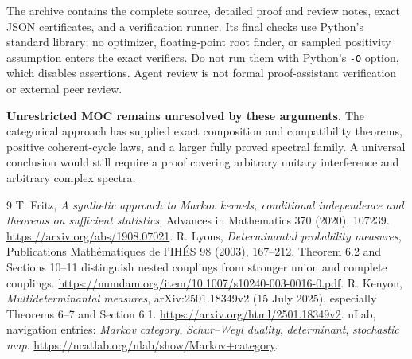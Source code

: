 \documentclass[11pt]{article}
\begin{document}
The archive contains the complete source, detailed proof and review notes, exact JSON certificates, and a verification runner. Its final checks use Python's standard library; no optimizer, floating-point root finder, or sampled positivity assumption enters the exact verifiers. Do not run them with Python's \texttt{-O} option, which disables assertions. Agent review is not formal proof-assistant verification or external peer review.

\textbf{Unrestricted MOC remains unresolved by these arguments.} The categorical approach has supplied exact composition and compatibility theorems, positive coherent-cycle laws, and a larger fully proved spectral family. A universal conclusion would still require a proof covering arbitrary unitary interference and arbitrary complex spectra.

\begin{thebibliography}{9}
 T. Fritz, \emph{A synthetic approach to Markov kernels, conditional independence and theorems on sufficient statistics}, Advances in Mathematics 370 (2020), 107239. \url{https://arxiv.org/abs/1908.07021}.
 R. Lyons, \emph{Determinantal probability measures}, Publications Math\'ematiques de l'IH\'ES 98 (2003), 167--212. Theorem 6.2 and Sections 10--11 distinguish nested couplings from stronger union and complete couplings. \url{https://numdam.org/item/10.1007/s10240-003-0016-0.pdf}.
 R. Kenyon, \emph{Multideterminantal measures}, arXiv:2501.18349v2 (15 July 2025), especially Theorems 6--7 and Section 6.1. \url{https://arxiv.org/html/2501.18349v2}.
 nLab, navigation entries: \emph{Markov category}, \emph{Schur--Weyl duality}, \emph{determinant}, \emph{stochastic map}. \url{https://ncatlab.org/nlab/show/Markov+category}.
\end{thebibliography}
\end{document}
